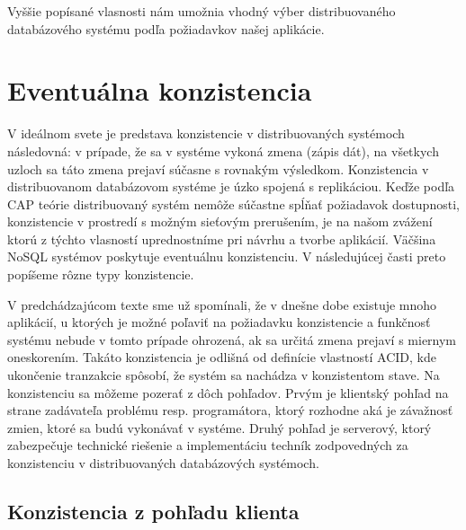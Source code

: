 \documentclass[11pt,twoside,a4paper]{book}
\begin{document}
Vyššie popísané vlasnosti nám umožnia vhodný výber distribuovaného databázového systému podľa požiadavkov našej aplikácie.

%





\section{Eventuálna konzistencia}

V ideálnom svete je predstava konzistencie v distribuovaných systémoch následovná: v prípade, že sa v systéme vykoná zmena (zápis dát), na všetkych uzloch sa táto zmena prejaví súčasne s rovnakým výsledkom. Konzistencia v distribuovanom databázovom systéme je úzko spojená s replikáciou. Keďže podľa CAP teórie distribuovaný systém  nemôže súčastne spĺňať požiadavok dostupnosti, konzistencie v prostredí s možným sieťovým prerušením, je na našom zvážení ktorú z týchto vlasností uprednostníme pri návrhu a tvorbe aplikácií. Väčšina NoSQL systémov poskytuje eventuálnu konzistenciu. V následujúcej časti preto popíšeme rôzne typy konzistencie.

V predchádzajúcom texte sme už spomínali, že v dnešne dobe existuje mnoho aplikácií, u ktorých je možné poľaviť na požiadavku konzistencie a funkčnosť systému nebude v tomto prípade ohrozená, ak sa určitá zmena prejaví s miernym oneskorením. Takáto konzistencia je odlišná od definície vlastností ACID, kde ukončenie tranzakcie spôsobí, že systém sa nachádza v konzistentom stave. Na konzistenciu sa môžeme pozerať z dôch pohľadov. Prvým je klientský pohľad na strane zadávateľa problému resp. programátora, ktorý rozhodne aká je závažnosť zmien, ktoré sa budú vykonávať v systéme. Druhý pohľad je serverový, ktorý zabezpečuje technické riešenie a implementáciu techník  zodpovedných za konzistenciu v distribuovaných databázových systémoch.


\subsection{Konzistencia z pohľadu klienta}
\end{document}
